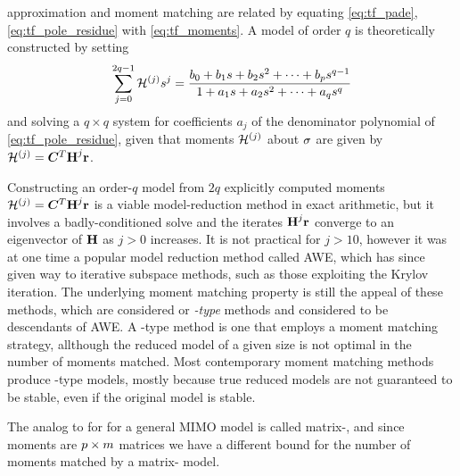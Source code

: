 \pade{} approximation and moment matching are related by equating \eqref{eq:tf_pade},\eqref{eq:tf_pole_residue} with \eqref{eq:tf_moments}.     A \pade{} model of order $q$ is theoretically constructed by setting 
\[
 \sum_{j=0}^{2q-1} \mo{j} s^j  =
  \frac{b_0 + b_1 s + b_2 s^2 +  \cdots + b_ps^{q-1}}%
	{1 + a_1 s + a_2 s^2 + \cdots + a_q s^q}
\]
and solving a $q \times q$ system for coefficients $a_j$ of the denominator polynomial of \eqref{eq:tf_pole_residue}, given  that moments $\mathcal{H}^{(j)}$ about $\sigma$ are given by $\mathcal{H}^{(j)} = \bm{C}^T \textbf{\textup{H}}^j \textbf{\textup{r}}$.

Constructing an order-$q$ \pade{} model from $2q$ explicitly computed moments   $\mathcal{H}^{(j)} = \bm{C}^T \textbf{\textup{H}}^j \textbf{\textup{r}}$ is a viable model-reduction method in exact arithmetic, but it involves a badly-conditioned solve and the iterates $\textbf{\textup{H}}^j \textbf{\textup{r}}$  converge to an eigenvector of $\textbf{\textup{H}}$ as $j>0$ increases.  It is not practical for $j>10$, however it was at one time a popular model reduction method called AWE, which has since given way to iterative subspace methods, such as those exploiting the Krylov iteration.  The underlying moment matching property is still the appeal of these methods, which are considered \pade{} or \emph{\pade{}-type} methods and considered to be descendants of AWE.  A \pade{}-type method is one that employs a moment matching strategy, allthough the reduced model of a given size is not optimal in the number of moments matched.  Most contemporary moment matching methods produce \pade{}-type models, mostly because true \pade{} reduced models are not guaranteed to be stable, even if the original model is stable. 


The analog to \pade{} for for a general MIMO model is called matrix-\pade{}, and since moments are $p \times m$ matrices we have a different bound for the number of moments matched by a matrix-\pade{} model.

